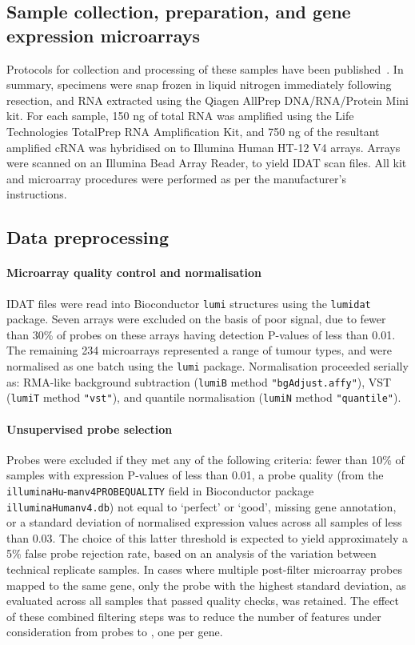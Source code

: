 \documentclass[dissertation.tex]{subfiles}
\begin{document}
\subsection{Sample collection, preparation, and gene expression microarrays}
Protocols for collection and processing of these samples have been published~\cite{Biankin2012}.  In summary, specimens were snap frozen in liquid nitrogen immediately following resection, and RNA extracted using the Qiagen AllPrep DNA/RNA/Protein Mini kit.  For each sample, 150 ng of total RNA was amplified using the Life Technologies TotalPrep RNA Amplification Kit, and 750 ng of the resultant amplified cRNA was hybridised on to Illumina Human HT-12 V4 arrays.  Arrays were scanned on an Illumina Bead Array Reader, to yield \gls{IDAT} scan files.  All kit and microarray procedures were performed as per the manufacturer's instructions.

\subsection{Data preprocessing}
\paragraph{Microarray quality control and normalisation}
\gls{IDAT} files were read into Bioconductor \texttt{lumi} structures using the \texttt{lumidat} package.  Seven arrays were excluded on the basis of poor signal, due to fewer than 30\% of probes on these arrays having detection P-values of less than 0.01.  The remaining 234 microarrays represented a range of tumour types, and were normalised as one batch using the \texttt{lumi} package.  Normalisation proceeded serially as: RMA-like background subtraction (\texttt{lumiB} method \texttt{"bgAdjust.affy"}), \gls{VST} (\texttt{lumiT} method \texttt{"vst"}), and quantile normalisation (\texttt{lumiN} method \texttt{"quantile"}).

\paragraph{Unsupervised probe selection}
Probes were excluded if they met any of the following criteria: fewer than 10\% of samples with expression P-values of less than 0.01, a probe quality (from the \texttt{illuminaHu}-\texttt{manv4PROBEQUALITY} field in Bioconductor package \texttt{illuminaHumanv4.db}) not equal to `perfect' or `good', missing gene annotation, or a standard deviation of normalised expression values across all samples of less than 0.03.  The choice of this latter threshold is expected to yield approximately a 5\% false probe rejection rate, based on an analysis of the variation between technical replicate samples.  In cases where multiple post-filter microarray probes mapped to the same gene, only the probe with the highest standard deviation, as evaluated across all samples that passed quality checks, was retained.  The effect of these combined filtering steps was to reduce the number of features under consideration from  probes to , one per gene.
\end{document}
